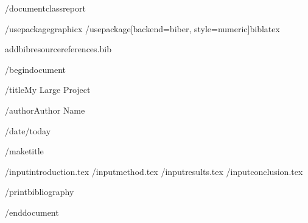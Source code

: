 /documentclass{report} %

/usepackage{graphicx} %
/usepackage[backend=biber, style=numeric]{biblatex}

addbibresource{references.bib} %

/begin{document}

/title{My Large Project}

/author{Author Name}

/date{/today}

/maketitle

/input{introduction.tex} %
/input{method.tex} %
/input{results.tex} %
/input{conclusion.tex} %

/printbibliography %

/end{document}

            